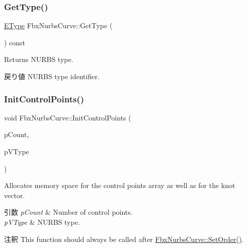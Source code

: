 \subsubsection{\texorpdfstring{Get\+Type()}{GetType()}}
{\footnotesize\ttfamily \hyperlink{class_fbx_nurbs_curve_a9f232f09798b106dcc2fd5e2d8c117ed}{E\+Type} Fbx\+Nurbs\+Curve\+::\+Get\+Type (\begin{DoxyParamCaption}{ }\end{DoxyParamCaption}) const}

Returns N\+U\+R\+BS type. \begin{DoxyReturn}{戻り値}
N\+U\+R\+BS type identifier. 
\end{DoxyReturn}
\mbox{\label{class_fbx_nurbs_curve_ac89cc4d5bf1bef1d88ee1b6e4b18be9b}} 
\subsubsection{\texorpdfstring{Init\+Control\+Points()}{InitControlPoints()}\hspace{0.1cm}{\footnotesize\ttfamily [1/2]}}
{\footnotesize\ttfamily void Fbx\+Nurbs\+Curve\+::\+Init\+Control\+Points (\begin{DoxyParamCaption}\item[{int}]{p\+Count,  }\item[{\hyperlink{class_fbx_nurbs_curve_a9f232f09798b106dcc2fd5e2d8c117ed}{E\+Type}}]{p\+V\+Type }\end{DoxyParamCaption})}

Allocates memory space for the control points array as well as for the knot vector. 
\begin{DoxyParams}{引数}
{\em p\+Count} & Number of control points. \\
\hline
{\em p\+V\+Type} & N\+U\+R\+BS type. \\
\hline
\end{DoxyParams}
\begin{DoxyRemark}{注釈}
This function should always be called after \hyperlink{class_fbx_nurbs_curve_a86494a5ca4d88af6700d0d1345852736}{Fbx\+Nurbs\+Curve\+::\+Set\+Order()}. 
\end{DoxyRemark}
\mbox{\label{class_fbx_nurbs_curve_ae6a6921bd7bbe88bcda86f14e9639df0}} 
